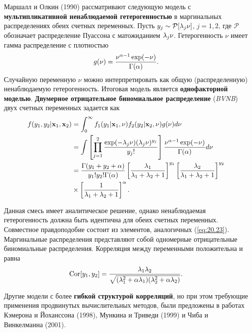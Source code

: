 Маршалл и Олкин (1990) рассматривают следующую модель с \textbf{мультипликативной ненаблюдаемой гетерогенностью} в маргинальных распределениях обеих счетных переменных. Пусть $y_j \sim \mathcal{P}[\lambda_j\nu]$, $j = 1, 2$, где $\mathcal{P}$ обозначает распределение Пуассона с матожиданием $\lambda_j\nu$. Гетерогенность $\nu$ имеет гамма распределение с плотностью
        $$g(\nu) = \frac{\nu^{\alpha - 1}\exp(-\nu)}{\Gamma(\alpha)}.$$
Случайную переменную $\nu$ можно интерпретировать как общую (распределенную) ненаблюдаемую гетерогенность. Итоговая модель является \textbf{однофакторной моделью}. \textbf{Двумерное отрицательное биномиальное распределение} (\textit{BVNB}) двух счетных переменных задается как
    \begin{align}\label{eq:20.23}
    f(y_1, y_2|\mathbf{x}_1, \mathbf{x}_2)  &= \int^{\infty}_{0} f_1(y_1|\mathbf{x}_1, \nu) f_2(y_2|\mathbf{x}_2, \nu) g(\nu) d\nu \\
                            &= \int \left[ \prod^2_{j = 1}\frac{\exp(-\lambda_j\nu)(\lambda_j\nu)^{y_j}}{y_j!}  \right] \frac{\nu^{\alpha - 1} \exp(-\nu)}{\Gamma(\alpha)} d\nu \notag \\
                            &= \frac{\Gamma(y_1 + y_2 + \alpha)}{y_1! y_2! \Gamma(\alpha)} \left[ \frac{\lambda_1}{\lambda_1 + \lambda_2 + 1} \right]^{y_1} \left[ \frac{\lambda_2}{\lambda_1 + \lambda_2 + 1} \right]^{y_2} \notag \\
                            &\times \left[ \frac{1}{\lambda_1 + \lambda_2 + 1} \right]^{\alpha}. \notag
    \end{align}

Данная смесь имеет аналитическое решение, однако ненаблюдаемая гетерогенность должна быть идентична для обеих счетных переменных. Совместное правдоподобие состоит из элементов, аналогичных (\ref{eq:20.23}). Маргинальные распределения представляют собой одномерные отрицательные биномиальные распределения. Корреляция между переменными положительна и равна
    \begin{align}\label{eq:20.24}
    \mathrm{Cor}[y_1, y_2] = \frac{\lambda_1 \lambda_2}{\sqrt{(\lambda_1^2 + \alpha \lambda_1)(\lambda_2^2 + \alpha \lambda_2)}}.
    \end{align}

Другие модели с более \textbf{гибкой структурой корреляций}, но при этом требующие применения продвинутых вычислительных методов, были предложены в работах Кэмерона и Йоханссона (1998), Мункина и Триведи (1999) и Чиба и Винкелманна (2001).


